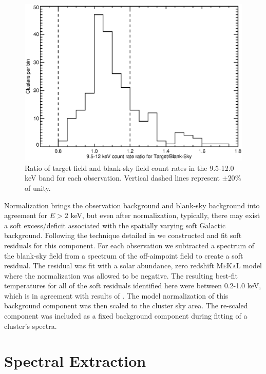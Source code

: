\documentclass[12pt,preprint]{aastex}
\begin{document}
\begin{figure}
\begin{center}
\includegraphics*[width=\textwidth, trim=5mm 0mm 0mm 0mm, clip]{f2.eps}
\caption{
Ratio of target field and blank-sky field count rates in the 9.5-12.0
keV band for each observation. Vertical dashed lines represent $\pm
20\%$ of unity.
}
\label{fig:bgd}
\end{center}
\end{figure}

Normalization brings the observation background and blank-sky
background into agreement for $E > 2$ keV, but even after
normalization, typically, there may exist a soft excess/deficit
associated with the spatially varying soft Galactic
background. Following the technique detailed in
\cite{2005ApJ...628..655V} we constructed and fit soft residuals for
this component. For each observation we subtracted a spectrum of the
blank-sky field from a spectrum of the off-aimpoint field to create a
soft residual. The residual was fit with a solar abundance, zero
redshift {\textsc{MeKaL}} model \citep{1985A&AS...62..197M,
1986A&AS...65..511M, 1992SRON, 1995ApJ...438L.115L} where the
normalization was allowed to be negative. The resulting best-fit
temperatures for all of the soft residuals identified here were
between 0.2-1.0 keV, which is in agreement with results of
\cite{2005ApJ...628..655V}. The model normalization of this background
component was then scaled to the cluster sky area. The re-scaled
component was included as a fixed background component during fitting
of a cluster's spectra.

\section{Spectral Extraction} \label{sec:extraction}
\end{document}
